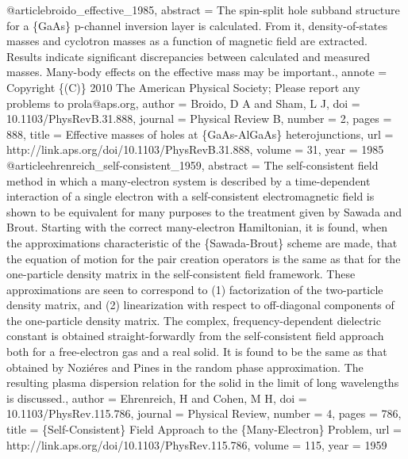 @article{broido_effective_1985,
abstract = {The spin-split hole subband structure for a \{GaAs\} p-channel inversion layer is calculated. From it, density-of-states masses and cyclotron masses as a function of magnetic field are extracted. Results indicate significant discrepancies between calculated and measured masses. Many-body effects on the effective mass may be important.},
annote = {Copyright \{(C)\} 2010 The American Physical Society; Please report any problems to prola@aps.org},
author = {Broido, D A and Sham, L J},
doi = {10.1103/PhysRevB.31.888},
journal = {Physical Review B},
number = {2},
pages = {888},
title = {{Effective masses of holes at \{GaAs-AlGaAs\} heterojunctions}},
url = {http://link.aps.org/doi/10.1103/PhysRevB.31.888},
volume = {31},
year = {1985}
}
@article{ehrenreich_self-consistent_1959,
abstract = {The self-consistent field method in which a many-electron system is described by a time-dependent interaction of a single electron with a self-consistent electromagnetic field is shown to be equivalent for many purposes to the treatment given by Sawada and Brout. Starting with the correct many-electron Hamiltonian, it is found, when the approximations characteristic of the \{Sawada-Brout\} scheme are made, that the equation of motion for the pair creation operators is the same as that for the one-particle density matrix in the self-consistent field framework. These approximations are seen to correspond to (1) factorization of the two-particle density matrix, and (2) linearization with respect to off-diagonal components of the one-particle density matrix. The complex, frequency-dependent dielectric constant is obtained straight-forwardly from the self-consistent field approach both for a free-electron gas and a real solid. It is found to be the same as that obtained by Nozi\'{e}res and Pines in the random phase approximation. The resulting plasma dispersion relation for the solid in the limit of long wavelengths is discussed.},
author = {Ehrenreich, H and Cohen, M H},
doi = {10.1103/PhysRev.115.786},
journal = {Physical Review},
number = {4},
pages = {786},
title = {{\{Self-Consistent\} Field Approach to the \{Many-Electron\} Problem}},
url = {http://link.aps.org/doi/10.1103/PhysRev.115.786},
volume = {115},
year = {1959}
}
